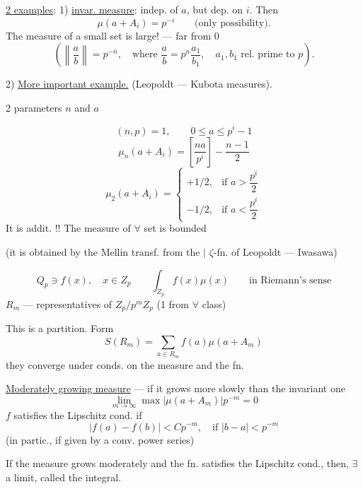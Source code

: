 \uline{2 examples}: 1) \uline{invar. measure}: indep. of $a$, but dep. on $i$.
Then
\[
\mu(a+A_i)=p^{-i}\qquad\text{(only possibility).}
\]
The measure of a small set is large! — far from $0$
\[
\left(\left\|\frac ab\right\|=p^{-n},\quad
\text{where }\frac ab=p^n\frac{a_1}{b_1},\quad
a_1,b_1\text{ rel. prime to }p\right).
\]

2) \uline{More important example.} (Leopoldt — Kubota measures).
\begin{flushright}
2 parameters $n$ and $a$
\end{flushright}
\[
(n,p)=1,\qquad 0\le a\le p^i-1
\]
\[
\mu_n(a+A_i)=\left[\frac{na}{p^i}\right]-\frac{n-1}{2}
\]
\[
\mu_2(a+A_i)=
\begin{cases}
+1/2,&\text{if }a>\dfrac{p^i}{2}\\
-1/2,&\text{if }a<\dfrac{p^i}{2}
\end{cases}
\]
It is addit. !! The measure of $\forall$ set is bounded

(it is obtained by the Mellin transf. from the $\vert$ $\zeta$-fn. of Leopoldt — Iwasawa)


\[
Q_p\ni f(x),\quad x\in Z_p\qquad
\int_{Z_p}f(x)\mu(x)\qquad\text{in Riemann’s sense}
\]
$R_m$ — representatives of $Z_p/p^mZ_p$ (1 from $\forall$ class)

This is a partition. Form
\[
S(R_m)=\sum_{a\in R_m}f(a)\mu(a+A_m)
\]
they converge under conds. on the measure and the fn.

\uline{Moderately growing measure} — if it grows more slowly than the invariant one
\[
\lim_{m\to\infty}\max|\mu(a+A_m)|p^{-m}=0
\]
$f$ satisfies the Lipschitz cond. if
\[
 |f(a)-f(b)|<Cp^{-m},\quad\text{if }|b-a|<p^{-m}
\]
(in partic., if given by a conv. power series)

If the measure grows moderately and the fn. satisfies the Lipschitz cond., then, $\exists$ a limit, called the integral.



